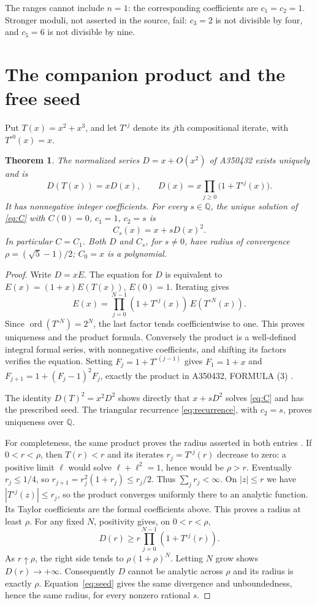 \documentclass[11pt]{article}
\newtheorem{theorem}{Theorem}
\newcommand{\Q}{\mathbb Q}
\newcommand{\ord}{\operatorname{ord}}
\begin{document}
The ranges cannot include $n=1$: the corresponding coefficients are
$c_1=c_2=1$. Stronger moduli, not asserted in the source, fail:
$c_3=2$ is not divisible by four, and $c_5=6$ is not divisible by nine.

\section{The companion product and the free seed}

Put $T(x)=x^2+x^3$, and let $T^{\circ j}$ denote its $j$th
compositional iterate, with $T^{\circ0}(x)=x$.

\begin{theorem}\label{thm:product}
The normalized series $D=x+O(x^2)$ of A350432 exists uniquely and is
\[
 D(T(x))=xD(x),\qquad
 D(x)=x\prod_{j\ge0}\bigl(1+T^{\circ j}(x)\bigr).
\]
It has nonnegative integer coefficients. For every $s\in\Q$, the
unique solution of \eqref{eq:C} with $C(0)=0$, $c_1=1$, $c_2=s$ is
\begin{equation}\label{eq:seed}
 C_s(x)=x+sD(x)^2.
\end{equation}
In particular $C=C_1$. Both $D$ and $C_s$, for $s\ne0$, have radius of
convergence $\rho=(\sqrt5-1)/2$; $C_0=x$ is a polynomial.
\end{theorem}
\begin{proof}
Write $D=xE$. The equation for $D$ is equivalent to
$E(x)=(1+x)E(T(x))$, $E(0)=1$. Iterating gives
\[
 E(x)=\prod_{j=0}^{N-1}(1+T^{\circ j}(x))\,E(T^{\circ N}(x)).
\]
Since $\ord(T^{\circ N})=2^N$, the last factor tends coefficientwise
to one. This proves uniqueness and the product formula. Conversely the
product is a well-defined integral formal series, with nonnegative
coefficients, and shifting its factors verifies the equation.
Setting $F_j=1+T^{\circ(j-1)}$ gives
$F_1=1+x$ and $F_{j+1}=1+(F_j-1)^2F_j$, exactly the product
in A350432, FORMULA (3) \cite{h350}.

The identity $D(T)^2=x^2D^2$ shows directly that $x+sD^2$ solves
\eqref{eq:C} and has the prescribed seed. The triangular recurrence
\eqref{eq:recurrence}, with $c_2=s$, proves uniqueness over $\Q$.

For completeness, the same product proves the radius asserted in both
entries \cite{h472,h350}. If $0<r<\rho$, then $T(r)<r$ and its
iterates $r_j=T^{\circ j}(r)$ decrease to zero: a positive limit $\ell$
would solve $\ell+\ell^2=1$, hence would be $\rho>r$.
Eventually $r_j\le1/4$, so $r_{j+1}=r_j^2(1+r_j)\le r_j/2$.
Thus $\sum_j r_j<\infty$. On $|z|\le r$ we have
$|T^{\circ j}(z)|\le r_j$, so the product converges uniformly there
to an analytic function. Its Taylor coefficients are the formal
coefficients above. This proves a radius at least $\rho$.
For any fixed $N$, positivity gives, on $0<r<\rho$,
\[
 D(r)\ge r\prod_{j=0}^{N-1}(1+T^{\circ j}(r)).
\]
As $r\uparrow\rho$, the right side tends to
$\rho(1+\rho)^N$. Letting $N$ grow shows $D(r)\to+\infty$.
Consequently $D$ cannot be analytic across $\rho$ and its radius is
exactly $\rho$. Equation~\eqref{eq:seed} gives the same divergence
and unboundedness, hence the same radius, for every nonzero rational $s$.
\end{proof}
\end{document}
